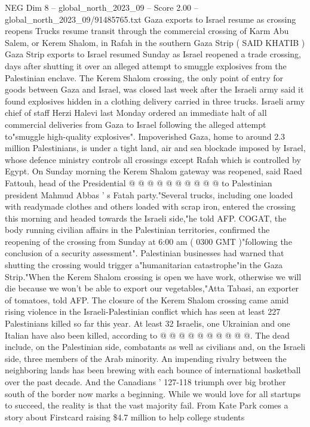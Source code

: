 \begin{textsample}{NEG Dim 8 – global\_north\_2023\_09 – Score 2.00 – global\_north\_2023\_09/91485765.txt}  \label{ex:f8_neg_158}
Gaza exports to Israel resume as crossing reopens Trucks resume transit through the commercial crossing of Karm Abu Salem, or Kerem Shalom, in Rafah in the southern Gaza Strip ( SAID KHATIB ) Gaza Strip exports to Israel resumed Sunday as Israel reopened a trade crossing, days after shutting it over an alleged attempt to smuggle explosives from the Palestinian enclave.
The Kerem Shalom crossing, the only point of entry for goods between Gaza and Israel, was closed last week after the Israeli army said it found explosives hidden in a clothing delivery carried in three trucks.
Israeli army chief of staff Herzi Halevi last Monday ordered an immediate halt of all commercial deliveries from Gaza to Israel following the alleged attempt to"smuggle high-quality explosives".
Impoverished Gaza, home to around 2.3 million Palestinians, is under a tight land, air and sea blockade imposed by Israel, whose defence ministry controls all crossings except Rafah which is controlled by Egypt.
On Sunday morning the Kerem Shalom gateway was reopened, said Raed Fattouh, head of the Presidential @ @ @ @ @ @ @ @ @ @ to Palestinian president Mahmud Abbas ' s Fatah party."Several trucks, including one loaded with readymade clothes and others loaded with scrap iron, entered the crossing this morning and headed towards the Israeli side,"he told AFP.
COGAT, the body running civilian affairs in the Palestinian territories, confirmed the reopening of the crossing from Sunday at 6:00 am ( 0300 GMT )"following the conclusion of a security assessment".
Palestinian businesses had warned that shutting the crossing would trigger a"humanitarian catastrophe"in the Gaza Strip."When the Kerem Shalom crossing is open we have work, otherwise we will die because we won't be able to export our vegetables,"Atta Tabasi, an exporter of tomatoes, told AFP.
The closure of the Kerem Shalom crossing came amid rising violence in the Israeli-Palestinian conflict which has seen at least 227 Palestinians killed so far this year.
At least 32 Israelis, one Ukrainian and one Italian have also been killed, according to @ @ @ @ @ @ @ @ @ @.
The dead include, on the Palestinian side, combatants as well as civilians and, on the Israeli side, three members of the Arab minority.
An impending rivalry between the neighboring lands has been brewing with each bounce of international basketball over the past decade.
And the Canadians ' 127-118 triumph over big brother south of the border now marks a beginning.
While we would love for all startups to succeed, the reality is that the vast majority fail.
From Kate Park comes a story about Firstcard raising \$4.7 million to help college students

\end{textsample}
